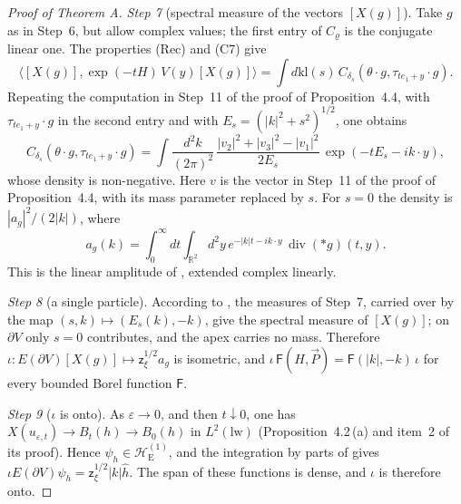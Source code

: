\documentclass[11pt]{amsart}
\theoremstyle{definition}
\begin{document}
\begin{proof}[Proof of Theorem A]
\emph{Step 7} (spectral measure of the vectors $[X(g)]$).
Take $g$ as in Step~6, but allow complex values;
the first entry of $C_\varrho$ is the conjugate linear one.
The properties (Rec) and (C7) give
\begin{equation*}
\bigl\langle[X(g)],\exp(-tH)\,V(y)[X(g)]\bigr\rangle=\int d\mathrm{kl}(s)\,C_{\delta_s}(\theta\cdot g,\tau_{te_1+y}\cdot g).
\end{equation*}
Repeating the computation in Step~11 of the proof of Proposition~4.4, with $\tau_{te_1+y}\cdot g$ in the second entry and with $E_s=(|k|^2+s^2)^{1/2}$, one obtains
\begin{equation*}
C_{\delta_s}(\theta\cdot g,\tau_{te_1+y}\cdot g)=\int\frac{d^2k}{(2\pi)^2}\,\frac{|v_2|^2+|v_3|^2-|v_1|^2}{2E_s}\,\exp(-tE_s-ik\cdot y),
\end{equation*}
whose density is non-negative.
Here $v$ is the vector in Step~11 of the proof of Proposition~4.4, with its mass parameter replaced by $s$.
For $s=0$ the density is $|a_g|^2/(2|k|)$, where
\[
a_g(k)=\int_0^\infty dt\int_{\mathbb R^2}d^2y\,
e^{-|k|t-ik\cdot y}\,\operatorname{div}(\ast g)(t,y).
\]
This is the linear amplitude of \cite[Lemma~12.26(a), Remark~12.27]{QEDII}, extended complex linearly.

\emph{Step 8} (a single particle).
According to \cite[Lemma~12.25]{QEDII}, the measures of Step~7, carried over by the map $(s,k)\mapsto(E_s(k),-k)$, give the spectral measure of $[X(g)]$;
on $\partial V$ only $s=0$ contributes, and the apex carries no mass.
Therefore $\iota\colon E(\partial V)[X(g)]\mapsto\mathsf z_\xi^{1/2}a_g$ is isometric, and $\iota\,\mathsf F(H,\vec P)=\mathsf F(|k|,-k)\,\iota$ for every bounded Borel function $\mathsf F$.

\emph{Step 9} ($\iota$ is onto).
As $\varepsilon\to0$, and then $t\downarrow0$, one has $X(u_{\varepsilon,t})\to B_t(h)\to B_0(h)$ in $L^2(\mathrm{lw})$ (Proposition~4.2\,(a) and item~2 of its proof).
Hence $\psi_h\in\mathcal H_{\mathrm E}^{(1)}$, and the integration by parts of \cite[Lemma~12.26\,(c)]{QEDII} gives $\iota E(\partial V)\psi_h=\mathsf z_\xi^{1/2}|k|\hat h$.
The span of these functions is dense, and $\iota$ is therefore onto.


\end{proof}
\end{document}
